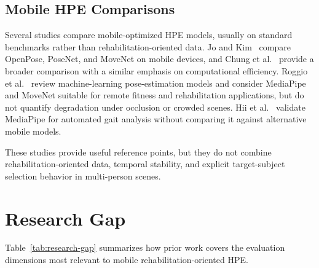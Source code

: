 \subsection{Mobile HPE Comparisons}
\label{sec:rw-mobile}

Several studies compare mobile-optimized HPE models, usually on standard benchmarks rather than rehabilitation-oriented data. Jo and Kim~\cite{jo2022comparative} compare OpenPose, PoseNet, and MoveNet on mobile devices, and Chung et al.~\cite{chung2022comparative} provide a broader comparison with a similar emphasis on computational efficiency. Roggio et al.~\cite{roggio2024comprehensive} review machine-learning pose-estimation models and consider MediaPipe and MoveNet suitable for remote fitness and rehabilitation applications, but do not quantify degradation under occlusion or crowded scenes. Hii et al.~\cite{hii2023gait} validate MediaPipe for automated gait analysis without comparing it against alternative mobile models.

These studies provide useful reference points, but they do not combine rehabilitation-oriented data, temporal stability, and explicit target-subject selection behavior in multi-person scenes.


\section{Research Gap}
\label{sec:research-gap}

Table~\ref{tab:research-gap} summarizes how prior work covers the evaluation dimensions most relevant to mobile rehabilitation-oriented HPE.

